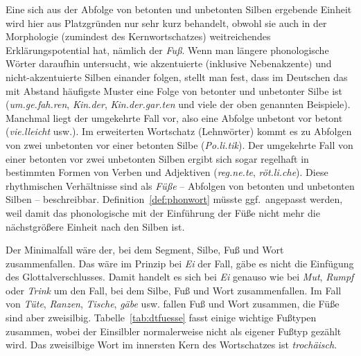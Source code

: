 \begin{exe}
  \ex\label{ex:phol9101}
  \begin{xlist}
  \end{xlist}
\end{exe}

Eine sich aus der Abfolge von betonten und unbetonten Silben ergebende Einheit wird hier aus Platzgründen nur sehr kurz behandelt, obwohl sie auch in der Morphologie (zumindest des Kernwortschatzes) weitreichendes Erklärungspotential hat, nämlich der \textit{Fuß}.
Wenn man längere phonologische Wörter daraufhin untersucht, wie akzentuierte (inklusive Nebenakzente) und nicht-akzentuierte Silben einander folgen, stellt man fest, dass im Deutschen das mit Abstand häufigste Muster eine Folge von betonter und unbetonter Silbe ist (\textit{\Akz um.ge.\Akz fah.ren}, \textit{\Akz Kin.der}, \textit{\Akz Kin.der.\Nakz gar.ten} und viele der oben genannten Beispiele).
Manchmal liegt der umgekehrte Fall vor, also eine Abfolge unbetont vor betont (\textit{vie.\Akz lleicht} usw.).
Im erweiterten Wortschatz (\idR Lehnwörter) kommt es zu Abfolgen von zwei unbetonten vor einer betonten Silbe (\textit{Po.li.\Akz tik}).
Der umgekehrte Fall von einer betonten vor zwei unbetonten Silben ergibt sich sogar regelhaft in bestimmten Formen von Verben und Adjektiven (\textit{\Akz reg.ne.te}, \textit{\Akz röt.li.che}).
Diese rhythmischen Verhältnisse sind als \textit{Füße} -- Abfolgen von betonten und unbetonten Silben -- beschreibbar.
Definition~\ref{def:phonwort} müsste ggf.\ angepasst werden, weil damit das phonologische mit der Einführung der Füße nicht mehr die nächstgrößere Einheit nach den Silben ist.


Der Minimalfall wäre der, bei dem Segment, Silbe, Fuß und Wort zusammenfallen.
Das wäre im Prinzip bei \textit{Ei} der Fall, gäbe es nicht die Einfügung des Glottalverschlusses.
Damit handelt es sich bei \textit{Ei} genauso wie bei \textit{Mut}, \textit{Rumpf} oder \textit{Trink} um den Fall, bei dem Silbe, Fuß und Wort zusammenfallen.
Im Fall von \textit{\Akz Tüte}, \textit{\Akz Ranzen}, \textit{\Akz Tische}, \textit{\Akz gäbe} usw. fallen Fuß und Wort zusammen, die Füße sind aber zweisilbig.
Tabelle~\ref{tab:dtfuesse} fasst einige wichtige Fußtypen zusammen, wobei der Einsilbler normalerweise nicht als eigener Fußtyp gezählt wird.
Das zweisilbige Wort im innersten Kern des Wortschatzes ist \textit{trochäisch}.

